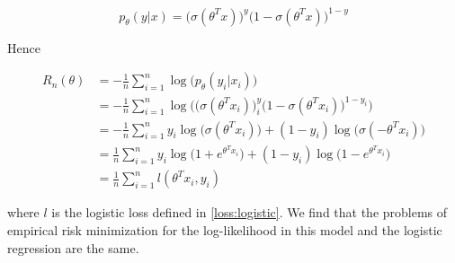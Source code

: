 \documentclass[
10pt, %
a4paper, %
oneside, %
headinclude,footinclude, %
BCOR5mm, %
]{scrartcl}
\begin{document}
\begin{equation*}
    p_{\theta}(y|x) = \big(\sigma(\theta^Tx)\big)^y\big(1-\sigma(\theta^Tx) \big)^{1-y}
\end{equation*}

Hence 

\begin{equation*}
    \begin{aligned}
	R_n(\theta) &= - \frac{1}{n} \sum^{n}_{i=1} \log\big(p_{\theta}(y_i|x_i)\big)\\
	&=- \frac{1}{n} \sum^{n}_{i=1} \log\Big(\big(\sigma(\theta^Tx_i)\big)^y_i\big(1-\sigma(\theta^Tx_i) \big)^{1-y_i}\Big)\\
	&=- \frac{1}{n} \sum^{n}_{i=1} y_i\log\Big(\sigma(\theta^Tx_i)\Big)+ (1-y_i)\log\Big(\sigma(-\theta^Tx_i)\Big)\\
	&=\frac{1}{n} \sum^{n}_{i=1} y_i\log\Big(1+e^{\theta^Tx_i}\Big)+ (1-y_i)\log\Big(1-e^{\theta^Tx_i}\Big)\\
	&=\frac{1}{n} \sum^{n}_{i=1} l(\theta^Tx_i,y_i)
    \end{aligned}
\end{equation*}

where $l$ is the logistic loss defined in \ref{loss:logistic}. We find that the problems of empirical risk minimization for the log-likelihood in this model and the logistic regression are the same.


 
\end{document}

